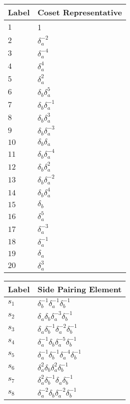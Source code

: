 \documentclass{article}
\begin{document}
\begin{center}
\begin{tabular}{ll}
\toprule
Label & Coset Representative\\
\midrule
$1$ & 1 \\
$2$ & $\delta_a^{-2}$ \\
$3$ & $\delta_a^{-4}$ \\
$4$ & $\delta_a^{4}$ \\
$5$ & $\delta_a^{2}$ \\
$6$ & $\delta_b^{}\delta_a^{5}$ \\
$7$ & $\delta_b^{}\delta_a^{-1}$ \\
$8$ & $\delta_b^{}\delta_a^{3}$ \\
$9$ & $\delta_b^{}\delta_a^{-3}$ \\
$10$ & $\delta_b^{}\delta_a^{}$ \\
$11$ & $\delta_b^{}\delta_a^{-4}$ \\
$12$ & $\delta_b^{}\delta_a^{2}$ \\
$13$ & $\delta_b^{}\delta_a^{-2}$ \\
$14$ & $\delta_b^{}\delta_a^{4}$ \\
$15$ & $\delta_b^{}$ \\
$16$ & $\delta_a^{5}$ \\
$17$ & $\delta_a^{-3}$ \\
$18$ & $\delta_a^{-1}$ \\
$19$ & $\delta_a^{}$ \\
$20$ & $\delta_a^{3}$ \\
\bottomrule
\end{tabular}
\hfill
\begin{tabular}{ll}
\toprule
Label & Side Pairing Element\\
\midrule
$s_{1}$ & $\delta_b^{-1}\delta_a^{-1}\delta_b^{-1}$ \\
$s_{2}$ & $\delta_a^{}\delta_b^{}\delta_a^{-3}\delta_b^{-1}$ \\
$s_{3}$ & $\delta_a^{}\delta_b^{-1}\delta_a^{-2}\delta_b^{-1}$ \\
$s_{4}$ & $\delta_a^{-1}\delta_b^{}\delta_a^{-5}\delta_b^{-1}$ \\
$s_{5}$ & $\delta_a^{-1}\delta_b^{-1}\delta_a^{-4}\delta_b^{-1}$ \\
$s_{6}$ & $\delta_a^{2}\delta_b^{}\delta_a^{2}\delta_b^{-1}$ \\
$s_{7}$ & $\delta_a^{2}\delta_b^{-1}\delta_a^{}\delta_b^{-1}$ \\
$s_{8}$ & $\delta_a^{-2}\delta_b^{}\delta_a^{-2}\delta_b^{-1}$ \\

\end{tabular}
\end{center}
\end{document}
